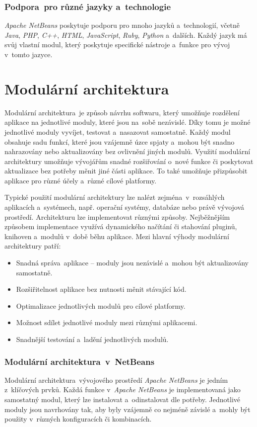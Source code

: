 \subsubsection{Podpora~pro různé jazyky a~technologie}
\emph{Apache NetBeans} poskytuje podporu pro mnoho jazyků a~technologií, včetně \emph{Java}, \emph{PHP}, \emph{C++}, \emph{HTML}, \emph{JavaScript}, \emph{Ruby}, \emph{Python} a~dalších. Každý jazyk má svůj vlastní modul, který poskytuje specifické nástroje a~funkce pro vývoj v~tomto jazyce.

\section{Modulární architektura}
Modulární architektura~je způsob návrhu softwaru, který umožňuje rozdělení aplikace na jednotlivé moduly, které jsou na~sobě nezávislé. Díky tomu je možné jednotlivé moduly vyvíjet, testovat a~nasazovat samostatně. Každý modul obsahuje sadu funkcí, které jsou vzájemně úzce spjaty a~mohou být snadno nahrazovány nebo aktualizovány bez ovlivnění jiných modulů. Využití modulární architektury umožňuje vývojářům snadné rozšiřování o~nové funkce či poskytovat aktualizace bez potřeby měnit jiné části aplikace. To také umožňuje přizpůsobit aplikace pro různé účely a~různé cílové platformy. 

Typické použití modulární architektury lze nalézt zejména~v~rozsáhlých aplikacích a~systémech, např. operační systémy, databáze nebo právě vývojová prostředí. Architekturu lze implementovat různými způsoby. Nejběžnějším způsobem implementace využívá dynamického načítání či stahování pluginů, knihoven a~modulů v~době běhu aplikace. Mezi hlavní výhody modulární architektury patří: 

\begin{itemize}
    \item Snadná správa~aplikace -- moduly jsou nezávislé a~mohou být aktualizovány samostatně. 
    \item Rozšiřitelnost aplikace bez nutnosti měnit stávající kód. 
    \item Optimalizace jednotlivých modulů pro cílové platformy.
    \item Možnost sdílet jednotlivé moduly mezi různými aplikacemi. 
    \item Snadnější testování a~ladění jednotlivých modulů. 
\end{itemize}

\subsubsection{Modulární architektura~v~NetBeans}
Modulární architektura~vývojového prostředí \emph{Apache NetBeans} je jedním z~klíčových prvků. Každá funkce v~\emph{Apache NetBeans} je implementovaná jako samostatný modul, který lze instalovat a~odinstalovat dle potřeby. Jednotlivé moduly jsou navrhovány tak, aby byly vzájemně co nejméně závislé a~mohly být použity v~různých konfiguracích či kombinacích. 

